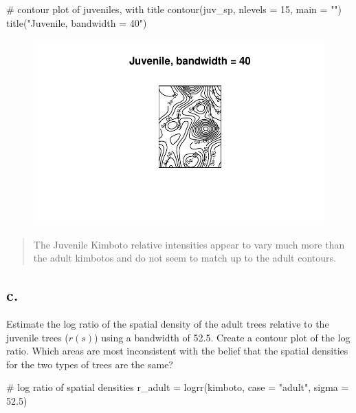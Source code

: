 \documentclass[
  letterpaper,
  DIV=11,
  numbers=noendperiod]{scrartcl}
\newenvironment{Shaded}{\begin{snugshade}}{\end{snugshade}}
\newcommand{\AttributeTok}[1]{\textcolor[rgb]{0.40,0.45,0.13}{#1}}
\newcommand{\CommentTok}[1]{\textcolor[rgb]{0.37,0.37,0.37}{#1}}
\newcommand{\DecValTok}[1]{\textcolor[rgb]{0.68,0.00,0.00}{#1}}
\newcommand{\FloatTok}[1]{\textcolor[rgb]{0.68,0.00,0.00}{#1}}
\newcommand{\FunctionTok}[1]{\textcolor[rgb]{0.28,0.35,0.67}{#1}}
\newcommand{\NormalTok}[1]{\textcolor[rgb]{0.00,0.23,0.31}{#1}}
\newcommand{\OtherTok}[1]{\textcolor[rgb]{0.00,0.23,0.31}{#1}}
\newcommand{\StringTok}[1]{\textcolor[rgb]{0.13,0.47,0.30}{#1}}
\begin{document}
\begin{Shaded}
\begin{Highlighting}[]
\CommentTok{\# contour plot of juveniles, with title}
\FunctionTok{contour}\NormalTok{(juv\_sp, }\AttributeTok{nlevels =} \DecValTok{15}\NormalTok{, }\AttributeTok{main =} \StringTok{""}\NormalTok{)}
\FunctionTok{title}\NormalTok{(}\StringTok{"Juvenile, bandwidth = 40"}\NormalTok{)}
\end{Highlighting}
\end{Shaded}

\begin{figure}[H]

{\centering \includegraphics{cc-r-kd-hw_files/figure-pdf/unnamed-chunk-10-2.pdf}

}

\end{figure}

\begin{quote}
The Juvenile Kimboto relative intensities appear to vary much more than
the adult kimbotos and do not seem to match up to the adult contours.
\end{quote}

\hypertarget{c.-1}{%
\subsection{c.}\label{c.-1}}

Estimate the log ratio of the spatial density of the adult trees
relative to the juvenile trees (\(r(s)\)) using a bandwidth of 52.5.
Create a contour plot of the log ratio. Which areas are most
inconsistent with the belief that the spatial densities for the two
types of trees are the same?

\begin{Shaded}
\begin{Highlighting}[]
\CommentTok{\# log ratio of spatial densities}
\NormalTok{r\_adult }\OtherTok{=} \FunctionTok{logrr}\NormalTok{(kimboto, }\AttributeTok{case =} \StringTok{"adult"}\NormalTok{, }\AttributeTok{sigma =} \FloatTok{52.5}\NormalTok{)}
\end{Highlighting}
\end{Shaded}
\end{document}
